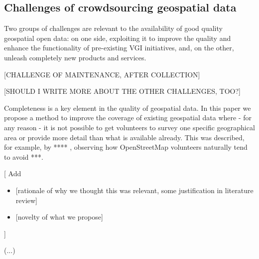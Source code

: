 \subsection{Challenges of crowdsourcing geospatial data}

    Two groups of challenges are relevant to the availability of good quality geospatial open data: on one side, exploiting it to improve the quality and enhance the functionality of pre-existing VGI initiatives, and, on the other, unleash completely new products and services.
    
    [CHALLENGE OF MAINTENANCE, AFTER COLLECTION]
    
    [SHOULD I WRITE MORE ABOUT THE OTHER CHALLENGES, TOO?]
    
    Completeness is a key element in the quality of geospatial data. In this paper we propose a method to improve the coverage of existing geospatial data where - for any reason - it is not possible to get volunteers to survey one specific geographical area or provide more detail than what is available already. This was described, for example, by **** , observing how OpenStreetMap volunteers naturally tend to avoid ***.
    
    {[}
    Add
    \begin{itemize}
    	\item {[}rationale of why we thought this was relevant, some justification in literature review{]}
    	\item {[}novelty of what we propose{]}
    \end{itemize}
    {]}
    
    {(}...{)}
